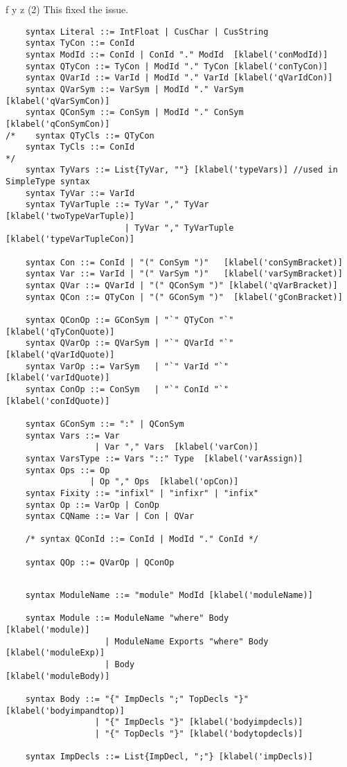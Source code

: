 f y z (2)
This fixed the issue.
\begin{lstlisting}
    syntax Literal ::= IntFloat | CusChar | CusString
    syntax TyCon ::= ConId
    syntax ModId ::= ConId | ConId "." ModId  [klabel('conModId)]
    syntax QTyCon ::= TyCon | ModId "." TyCon [klabel('conTyCon)]
    syntax QVarId ::= VarId | ModId "." VarId [klabel('qVarIdCon)]
    syntax QVarSym ::= VarSym | ModId "." VarSym  [klabel('qVarSymCon)]
    syntax QConSym ::= ConSym | ModId "." ConSym  [klabel('qConSymCon)]
/*    syntax QTyCls ::= QTyCon
    syntax TyCls ::= ConId
*/
    syntax TyVars ::= List{TyVar, ""} [klabel('typeVars)] //used in SimpleType syntax
    syntax TyVar ::= VarId
    syntax TyVarTuple ::= TyVar "," TyVar      [klabel('twoTypeVarTuple)]
                        | TyVar "," TyVarTuple [klabel('typeVarTupleCon)]

    syntax Con ::= ConId | "(" ConSym ")"   [klabel('conSymBracket)]
    syntax Var ::= VarId | "(" VarSym ")"   [klabel('varSymBracket)]
    syntax QVar ::= QVarId | "(" QConSym ")" [klabel('qVarBracket)]
    syntax QCon ::= QTyCon | "(" GConSym ")"  [klabel('gConBracket)]

    syntax QConOp ::= GConSym | "`" QTyCon "`"    [klabel('qTyConQuote)]
    syntax QVarOp ::= QVarSym | "`" QVarId "`"    [klabel('qVarIdQuote)]
    syntax VarOp ::= VarSym   | "`" VarId "`"     [klabel('varIdQuote)]
    syntax ConOp ::= ConSym   | "`" ConId "`"     [klabel('conIdQuote)]

    syntax GConSym ::= ":" | QConSym
    syntax Vars ::= Var
                  | Var "," Vars  [klabel('varCon)]
    syntax VarsType ::= Vars "::" Type  [klabel('varAssign)]
    syntax Ops ::= Op
                 | Op "," Ops  [klabel('opCon)]
    syntax Fixity ::= "infixl" | "infixr" | "infix"
    syntax Op ::= VarOp | ConOp
    syntax CQName ::= Var | Con | QVar

    /* syntax QConId ::= ConId | ModId "." ConId */

    syntax QOp ::= QVarOp | QConOp
\end{lstlisting}
\begin{lstlisting}

    syntax ModuleName ::= "module" ModId [klabel('moduleName)]

    syntax Module ::= ModuleName "where" Body          [klabel('module)]
                    | ModuleName Exports "where" Body  [klabel('moduleExp)]
                    | Body                             [klabel('moduleBody)]

    syntax Body ::= "{" ImpDecls ";" TopDecls "}" [klabel('bodyimpandtop)]
                  | "{" ImpDecls "}" [klabel('bodyimpdecls)]
                  | "{" TopDecls "}" [klabel('bodytopdecls)]

    syntax ImpDecls ::= List{ImpDecl, ";"} [klabel('impDecls)]
\end{lstlisting}

